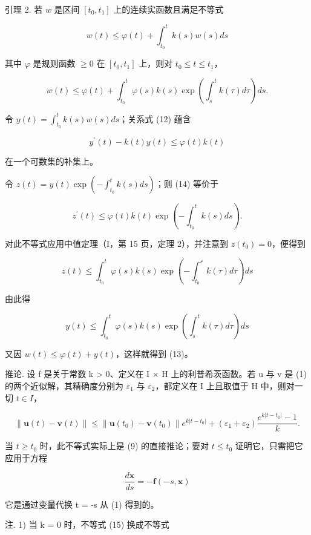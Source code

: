 引理 2. 若 \(w\) 是区间 \([t_0, t_1]\) 上的连续实函数且满足不等式

\[
w (t) \leqslant \varphi (t) + \int_ {t _ {0}} ^ {t} k (s) w (s) d s\tag{12}
\]

其中 \(\varphi\) 是规则函数 \(\geqslant 0\) 在 \([t_0, t_1]\) 上，则对 \(t_0 \leqslant t \leqslant t_1\)，

\[
w (t) \leqslant \varphi (t) + \int_ {t _ {0}} ^ {t} \varphi (s) k (s) \exp \left(\int_ {s} ^ {t} k (\tau) d \tau\right) d s.\tag{13}
\]

令 \(y(t) = \int_{t_0}^{t} k(s)w(s)ds\)；关系式 (12) 蕴含

\[
y ^ {\prime} (t) - k (t) y (t) \leqslant \varphi (t) k (t)\tag{14}
\]

在一个可数集的补集上。

令 \(z(t) = y(t)\exp \left(-\int_{t_0}^t k(s)ds\right)\)；则 (14) 等价于

\[
z ^ {\prime} (t) \leqslant \varphi (t) k (t) \exp \left(- \int_ {t _ {0}} ^ {t} k (s) d s\right).
\]

对此不等式应用中值定理（I，第 15 页，定理 2），并注意到 \(z(t_0) = 0\)，便得到

\[
z (t) \leqslant \int_ {t _ {0}} ^ {t} \varphi (s) k (s) \exp \left(- \int_ {t _ {0}} ^ {s} k (\tau) d \tau\right) d s
\]

由此得

\[
y (t) \leqslant \int_ {t _ {0}} ^ {t} \varphi (s) k (s) \exp \left(\int_ {s} ^ {t} k (\tau) d \tau\right) d s
\]

又因 \(w(t) \leqslant \varphi(t) + y(t)\)，这样就得到 (13)。

推论. 设 f 是关于常数 k \textgreater{} 0、定义在 I × H 上的利普希茨函数。若 u 与 v 是 (1) 的两个近似解，其精确度分别为 \(\varepsilon_{1}\) 与 \(\varepsilon_{2}\)，都定义在 I 上且取值于 H 中，则对一切 \(t \in I\)，

\[
\| \mathbf {u} (t) - \mathbf {v} (t) \| \leqslant \| \mathbf {u} (t _ {0}) - \mathbf {v} (t _ {0}) \| e ^ {k | t - t _ {0} |} + (\varepsilon_ {1} + \varepsilon_ {2}) \frac {e ^ {k | t - t _ {0} |} - 1}{k}.\tag{15}
\]

当 \(t \geqslant t_0\) 时，此不等式实际上是 (9) 的直接推论；要对 \(t \leqslant t_0\) 证明它，只需把它应用于方程

\[
{\frac {d \mathbf {x}}{d s}} = - \mathbf {f} (- s, \mathbf {x})
\]

它是通过变量代换 t = -s 从 (1) 得到的。

注. 1) 当 k = 0 时，不等式 (15) 换成不等式

